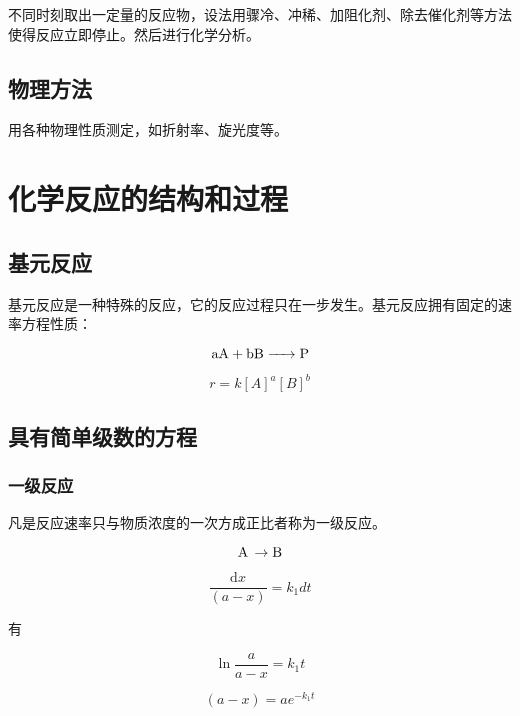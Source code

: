 \documentclass[a4paper]{ctexrep}
\renewcommand{\d}{\mathrm{d}}
\begin{document}
    不同时刻取出一定量的反应物，设法用骤冷、冲稀、加阻化剂、除去催化剂等方法使得反应立即停止。然后进行化学分析。

    \subsection{物理方法}

    用各种物理性质测定，如折射率、旋光度等。

    \section{化学反应的结构和过程}

    \subsection{基元反应}

    基元反应是一种特殊的反应，它的反应过程只在一步发生。基元反应拥有固定的速率方程性质：

    \begin{equation*}
      \ce{aA + bB -> P}
    \end{equation*}

    \begin{equation*}
      r = k[A]^a[B]^b
    \end{equation*}

    \subsection{具有简单级数的方程}

    \subsubsection{一级反应}

    凡是反应速率只与物质浓度的一次方成正比者称为一级反应。

    \[
      \ce{A \rightarrow B}
    \]

    \[
      \frac{ \d x} {(a - x)} = k_1 dt
    \]

    有

    \begin{equation*}
      \ln \frac{a}{a - x} = k_1 t
    \end{equation*}

    \begin{equation*}
      (a - x) = a e^{-k_1 t}
    \end{equation*}
\end{document}
